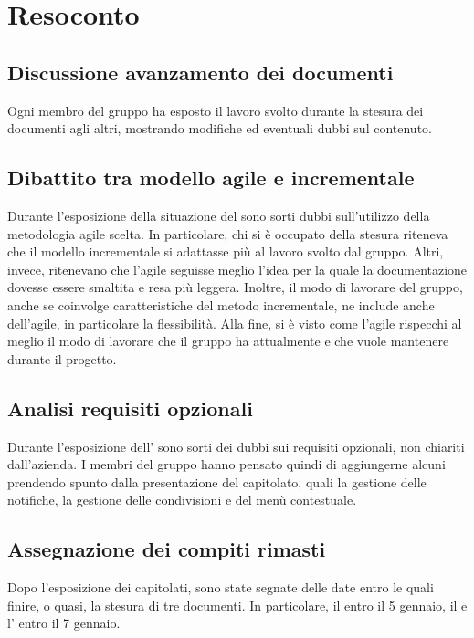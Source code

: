 \newpage




\section{Resoconto}

\subsection{Discussione avanzamento dei documenti}

Ogni membro del gruppo ha esposto il lavoro svolto durante la stesura dei documenti agli altri, mostrando modifiche ed eventuali dubbi sul contenuto. 

\subsection{Dibattito tra modello agile e incrementale}

Durante l'esposizione della situazione del \PdP{} sono sorti dubbi sull'utilizzo della metodologia agile scelta. In particolare, chi si è occupato della stesura riteneva che il modello incrementale si adattasse più al lavoro svolto dal gruppo. Altri, invece, ritenevano che l'agile seguisse meglio l'idea per la quale la documentazione dovesse essere smaltita e resa più leggera. Inoltre, il modo di lavorare del gruppo, anche se coinvolge caratteristiche del metodo incrementale, ne include anche dell'agile, in particolare la flessibilità. Alla fine, si è visto come l'agile rispecchi al meglio il modo di lavorare che il gruppo ha attualmente e che vuole mantenere durante il progetto.

\subsection{Analisi requisiti opzionali}

Durante l'esposizione dell'\AdR{} sono sorti dei dubbi sui requisiti opzionali, non chiariti dall'azienda. I membri del gruppo hanno pensato quindi di aggiungerne alcuni prendendo spunto dalla presentazione del capitolato, quali la gestione delle notifiche, la gestione delle condivisioni e del menù contestuale. 

\subsection{Assegnazione dei compiti rimasti}

Dopo l'esposizione dei capitolati, sono state segnate delle date entro le quali finire, o quasi, la stesura di tre documenti. In particolare, il \PdP{} entro il 5 gennaio, il \PdQ{} e l'\AdR{} entro il 7 gennaio. 



